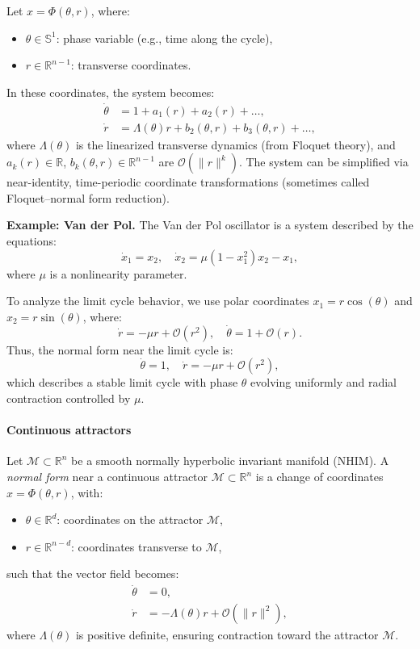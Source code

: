 \documentclass{article}
\theoremstyle{definition} \newtheorem{definition}{Definition}  \newtheorem{example}{Example}
\theoremstyle{remark} \newtheorem{remark}{Remark}
\newcommand{\reals}{\mathbb{R}}
\newcommand{\manifold}{\mathcal{M}}
\newcounter{ct}
\begin{document}
Let \( x = \Phi(\theta, r) \), where: %
\begin{itemize}
  \item \( \theta \in \mathbb{S}^1 \): phase variable (e.g., time along the cycle),
  \item \( r \in \mathbb{R}^{n-1} \): transverse coordinates.
\end{itemize}
In these coordinates, the system becomes:
\[
\begin{aligned}
\dot{\theta} &= 1 + a_1(r) + a_2(r) + \dots, \\
\dot{r} &= \Lambda(\theta) r + b_2(\theta, r) + b_3(\theta, r) + \dots,
\end{aligned}
\]
where \( \Lambda(\theta) \) is the linearized transverse dynamics (from Floquet theory),
and  \( a_k(r) \in \mathbb{R} \), \( b_k(\theta, r) \in \mathbb{R}^{n-1} \) are \( \mathcal{O}(\|r\|^k) \).
The system can be simplified via near-identity, time-periodic coordinate transformations (sometimes called Floquet–normal form reduction).

\textbf{Example: Van der Pol.} 
The Van der Pol oscillator is a system described by the equations:
\[
\dot{x}_1 = x_2, \quad \dot{x}_2 = \mu (1 - x_1^2) x_2 - x_1,
\]
where \( \mu \) is a nonlinearity parameter.

To analyze the limit cycle behavior, we use polar coordinates \( x_1 = r \cos(\theta) \) and \( x_2 = r \sin(\theta) \), where:
\[
\dot{r} = -\mu r + \mathcal{O}(r^2), \quad \dot{\theta} = 1 + \mathcal{O}(r).
\]
Thus, the normal form near the limit cycle is:
\[
\dot{\theta} = 1, \quad \dot{r} = -\mu r + \mathcal{O}(r^2),
\]
which describes a stable limit cycle with phase \( \theta \) evolving uniformly and radial contraction controlled by \( \mu \).


\paragraph{Continuous attractors}%
Let $\manifold\subset\reals^n$  be a smooth normally hyperbolic invariant manifold (NHIM).
A \emph{normal form} near a continuous attractor \(\manifold \subset \mathbb{R}^n \) is a change of coordinates 
\( x = \Phi(\theta, r) \), with:
\begin{itemize}
  \item \( \theta \in \mathbb{R}^d \): coordinates on the attractor \( \manifold\),
  \item \( r \in \mathbb{R}^{n-d} \): coordinates transverse to \(\manifold \),
\end{itemize}
such that the vector field becomes:
\[
\begin{aligned}
\dot{\theta} &= 0, \\
\dot{r} &= -\Lambda(\theta) r + \mathcal{O}(\|r\|^2),
\end{aligned}
\]
where \( \Lambda(\theta) \) is positive definite, ensuring contraction toward the attractor \(\manifold\).
\end{document}
